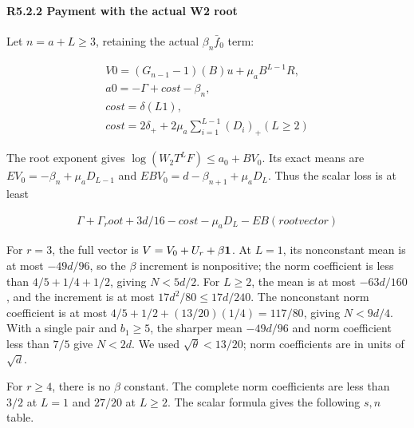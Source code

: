 \paragraph{R5.2.2 Payment with the actual W2 root}

Let \(n=a+L\ge3\), retaining the actual \(\beta_n\bar f_0\) term:

\[
\begin{gathered}
V0=(G_{n-1}-1)(B)u+\mu_a B^{L-1}R,\\
a0=-\Gamma+cost-\beta_n,\\
cost=\delta (L1),\\
cost=2\delta_++2\mu_a \sum_{i=1}^{L-1}(D_i)_+ (L\ge 2)
\end{gathered}
\]

The root exponent gives \(\log(W_2T^LF)\le a_0+BV_0\). Its exact means are \(EV_0=-\beta_n+\mu_aD_{L-1}\) and \(EBV_0=d-\beta_{n+1}+\mu_aD_L\). Thus the scalar loss is at least

\[
\begin{gathered}
\Gamma+\Gamma_root+3d/16-cost-\mu_aD_L-EB(root vector) 
\end{gathered}\tag{R5.2.2}
\]

For \(r=3\), the full vector is \(V=V_0+U_r+\beta\mathbf1\). At \(L=1\), its nonconstant mean is at most \(-49d/96\), so the \(\beta\) increment is nonpositive; the norm coefficient is less than \(4/5+1/4+1/2\), giving \(N<5d/2\). For \(L\ge2\), the mean is at most \(-63d/160\), and the increment is at most \(17d^2/80\le17d/240\). The nonconstant norm coefficient is at most \(4/5+1/2+(13/20)(1/4)=117/80\), giving \(N<9d/4\). With a single pair and \(b_1\ge5\), the sharper mean \(-49d/96\) and norm coefficient less than \(7/5\) give \(N<2d\). We used \(\sqrt\theta<13/20\); norm coefficients are in units of \(\sqrt d\).

For \(r\ge4\), there is no \(\beta\) constant. The complete norm coefficients are less than \(3/2\) at \(L=1\) and \(27/20\) at \(L\ge2\). The scalar formula gives the following \(s,\allowbreak \allowbreak  n\) table.


